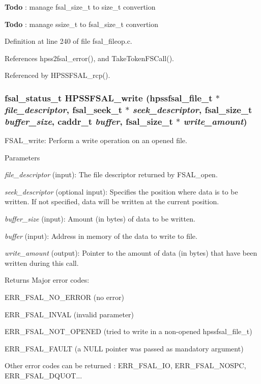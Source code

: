 \begin{Desc}
\item[{\bf Todo}]: manage fsal\_\-size\_\-t to size\_\-t convertion \end{Desc}


\begin{Desc}
\item[{\bf Todo}]: manage ssize\_\-t to fsal\_\-size\_\-t convertion \end{Desc}


Definition at line 240 of file fsal\_\-fileop.c.

References hpss2fsal\_\-error(), and TakeTokenFSCall().

Referenced by HPSSFSAL\_\-rcp().
\subsubsection[{HPSSFSAL\_\-write}]{\setlength{\rightskip}{0pt plus 5cm}fsal\_\-status\_\-t HPSSFSAL\_\-write (hpssfsal\_\-file\_\-t $\ast$ {\em file\_\-descriptor}, \/  fsal\_\-seek\_\-t $\ast$ {\em seek\_\-descriptor}, \/  fsal\_\-size\_\-t {\em buffer\_\-size}, \/  caddr\_\-t {\em buffer}, \/  fsal\_\-size\_\-t $\ast$ {\em write\_\-amount})}\label{fsal__fileop_8c_ad0b0eec536d1e6369d319300ee21c4b7}
FSAL\_\-write: Perform a write operation on an opened file.


\begin{DoxyParams}{Parameters}
\item[{\em file\_\-descriptor}](input): The file descriptor returned by FSAL\_\-open. \item[{\em seek\_\-descriptor}](optional input): Specifies the position where data is to be written. If not specified, data will be written at the current position. \item[{\em buffer\_\-size}](input): Amount (in bytes) of data to be written. \item[{\em buffer}](input): Address in memory of the data to write to file. \item[{\em write\_\-amount}](output): Pointer to the amount of data (in bytes) that have been written during this call.\end{DoxyParams}
\begin{DoxyReturn}{Returns}
Major error codes:
\begin{DoxyItemize}
\item ERR\_\-FSAL\_\-NO\_\-ERROR (no error)
\item ERR\_\-FSAL\_\-INVAL (invalid parameter)
\item ERR\_\-FSAL\_\-NOT\_\-OPENED (tried to write in a non-\/opened hpssfsal\_\-file\_\-t)
\item ERR\_\-FSAL\_\-FAULT (a NULL pointer was passed as mandatory argument)
\item Other error codes can be returned : ERR\_\-FSAL\_\-IO, ERR\_\-FSAL\_\-NOSPC, ERR\_\-FSAL\_\-DQUOT... 
\end{DoxyItemize}
\end{DoxyReturn}


